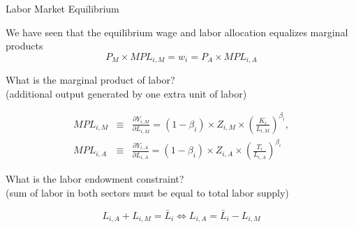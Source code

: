 \documentclass[notes,11pt, aspectratio=169, xcolor=table]{beamer}
\newenvironment{wideitemize}{\itemize\addtolength{\itemsep}{10pt}}{\enditemize}
\begin{document}
\begin{frame}{Labor Market Equilibrium}
    \begin{wideitemize}
        \item We have seen that the equilibrium wage and labor allocation equalizes marginal products
        \begin{equation*}
            P_M \times MPL_{i,M} = w_i = P_A \times MPL_{i,A}
        \end{equation*}

        \item<2-> What is the marginal product of labor? \\
        \qquad (additional output generated by one extra unit of labor)

        \begin{eqnarray*}
            MPL_{i,M} &\equiv& \frac{\partial Y_{i,M}}{\partial L_{i,M}} = (1-\beta_i)\times Z_{i,M} \times \left( \frac{K_{i}}{L_{i,M}} \right)^{\beta_i}, \\
            MPL_{i,A} &\equiv& \frac{\partial Y_{i,A}}{\partial L_{i,A}} = (1-\beta_i)\times Z_{i,A} \times \left( \frac{T_{i}}{L_{i,A}} \right)^{\beta_i}
        \end{eqnarray*}

        \item<3-> What is the labor endowment constraint? \\
        \qquad (sum of labor in both sectors must be equal to total labor supply)

        \begin{equation*}
            L_{i,A}+L_{i,M}=\bar{L}_{i} \iff  L_{i,A}=\bar{L}_{i} - L_{i,M}
        \end{equation*}
    \end{wideitemize}
\end{frame}
\end{document}
